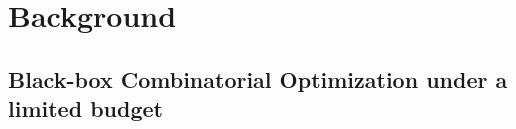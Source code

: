 \documentclass[runningheads]{llncs}
\begin{document}
%
%
%
%
%
%

\section{Background}\label{sec:backgroud}



\subsection{Black-box Combinatorial Optimization under a limited budget}
\end{document}
